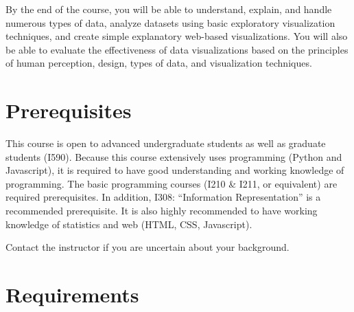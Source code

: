\documentclass[11pt,article,oneside]{memoir}
\begin{document}
By the end of the course, you will be able to understand, explain, and handle
numerous types of data, analyze datasets using basic exploratory visualization
techniques, and create simple explanatory web-based visualizations. You will
also be able to evaluate the effectiveness of data visualizations based on the
principles of human perception, design, types of data, and visualization
techniques. 
 




\section{Prerequisites}
\label{sec:Prerequisites}

This course is open to advanced undergraduate students as well as graduate
students (I590). Because this course extensively uses programming (Python and
Javascript), it is required to have good understanding and working knowledge of
programming. The basic programming courses (I210 \& I211, or equivalent) are
required prerequisites. In addition, I308: ``Information Representation'' is a
recommended prerequisite. It is also highly recommended to have working
knowledge of statistics and web (HTML, CSS, Javascript). 


Contact the instructor if you are uncertain about your background. 

\section{Requirements}
\label{sec:requirements}
\end{document}
